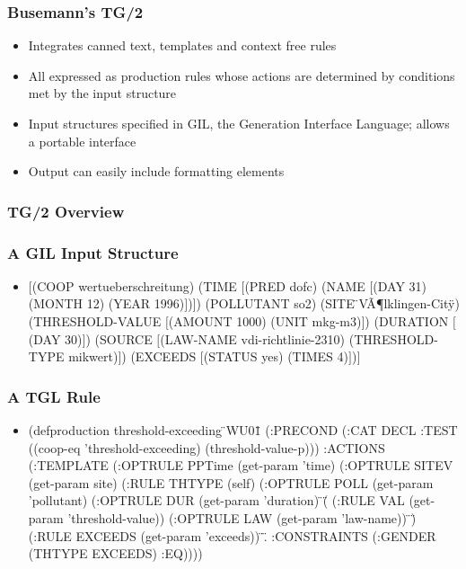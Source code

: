 \documentclass[compress,color=usenames]{beamer}
\begin{document}
\begin{frame}
\frametitle{
Busemann's TG/2}

\label{f53}
\begin{itemize}
\item {{Integrates canned text, templates and context free rules}}
\item {{All expressed as production rules whose actions are determined by conditions met by the input structure}}
\item {{Input structures specified in GIL, the Generation Interface Language; allows a portable interface}}
\item {{Output can easily include formatting elements}}
\end{itemize}
 
\end{frame}

\begin{frame}
\frametitle{
TG/2 Overview}

\label{f55}
 
\end{frame}

\begin{frame}
\frametitle{
A GIL Input Structure}

\label{f57}
\begin{itemize}
\item {{\mbox{$[$}(COOP wertueberschreitung)
           (TIME \mbox{$[$}(PRED dofc)
                  (NAME \mbox{$[$}(DAY 31) 
                         (MONTH 12) 
                         (YEAR 1996)\mbox{$]$})\mbox{$]$})
           (POLLUTANT so2)
           (SITE \"{}V\~A{\P}lklingen-City\"{})
           (THRESHOLD-VALUE \mbox{$[$}(AMOUNT 1000) 
                             (UNIT mkg-m3)\mbox{$]$})
           (DURATION \mbox{$[$}(DAY 30)\mbox{$]$})
           (SOURCE \mbox{$[$}(LAW-NAME vdi-richtlinie-2310)
                    (THRESHOLD-TYPE mikwert)\mbox{$]$})
           (EXCEEDS \mbox{$[$}(STATUS yes) 
                     (TIMES 4)\mbox{$]$})\mbox{$]$}}}
\end{itemize}
 
\end{frame}

\begin{frame}
\frametitle{
A TGL Rule}

\label{f59}
\begin{itemize}
\item {{(defproduction threshold-exceeding \"{}WU01\"{}
  (:PRECOND (:CAT DECL
             :TEST ((coop-eq 'threshold-exceeding)
                    (threshold-value-p)))
   :ACTIONS (:TEMPLATE
               (:OPTRULE PPTime (get-param 'time)
               (:OPTRULE SITEV (get-param site) 
               (:RULE THTYPE (self) 
               (:OPTRULE POLL (get-param 'pollutant) 
               (:OPTRULE DUR (get-param 'duration)
               \"{}(\"{} (:RULE VAL (get-param 'threshold-value)) 
                   (:OPTRULE LAW (get-param 'law-name)) \"{})\"{}
               (:RULE EXCEEDS (get-param 'exceeds)) \"{}.\"{}
             :CONSTRAINTS (:GENDER (THTYPE EXCEEDS) :EQ))))}}
\end{itemize}
 
\end{frame}
\end{document}
